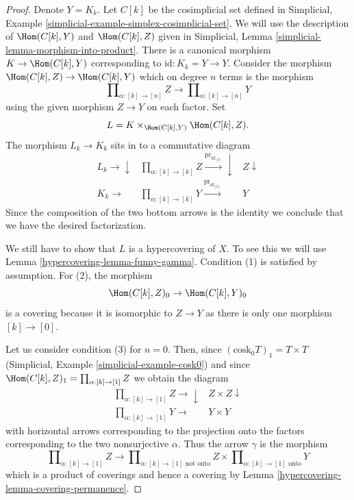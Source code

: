 \begin{proof}

Denote $Y = K_k$. Let $C[k]$ be the cosimplicial set defined in
Simplicial, Example \ref{simplicial-example-simplex-cosimplicial-set}.
We will use the description of $\Hom(C[k], Y)$ and $\Hom(C[k], Z)$
given in
Simplicial, Lemma \ref{simplicial-lemma-morphism-into-product}.
There is a canonical morphism
$K \to \Hom(C[k], Y)$ corresponding to $\text{id} : K_k = Y \to Y$.
Consider the morphism $\Hom(C[k], Z) \to \Hom(C[k], Y)$
which on degree $n$ terms is the morphism
$$
\prod\nolimits_{\alpha : [k] \to [n]} Z
\longrightarrow
\prod\nolimits_{\alpha : [k] \to [n]} Y
$$
using the given morphism $Z \to Y$ on each factor. Set
$$
L = K \times_{\Hom(C[k], Y)} \Hom(C[k], Z).
$$
The morphism $L_k \to K_k$ sits in to a commutative diagram
$$
\begin{array}{ccc}L_k \longrightarrow\downarrow & \prod_{\alpha : [k] \to [k]} Z \overset{\text{pr}_{\text{id}_{[k]}}}{\longrightarrow}\downarrow & Z \downarrow \\ K_k \longrightarrow & \prod_{\alpha : [k] \to [k]} Y \overset{\text{pr}_{\text{id}_{[k]}}}{\longrightarrow} & Y\end{array}
$$
Since the composition of the two bottom arrows is the identity
we conclude that we have the desired factorization.

\medskip\noindent
We still have to show that $L$ is a hypercovering of $X$.
To see this we will use Lemma \ref{hypercovering-lemma-funny-gamma}.
Condition (1) is satisfied by assumption.
For (2), the morphism
$$
\Hom(C[k], Z)_0 \to \Hom(C[k], Y)_0
$$
is a covering because it is isomorphic to $Z \to Y$ as
there is only one morphism $[k] \to [0]$.

\medskip\noindent
Let us consider condition (3) for $n = 0$. Then, since
$(\text{cosk}_0 T)_1 = T \times T$
(Simplicial, Example \ref{simplicial-example-cosk0})
and since $\Hom(C[k], Z)_1 = \prod_{\alpha : [k] \to [1]} Z$
we obtain the diagram
$$
\begin{array}{cc}\prod\nolimits_{\alpha : [k] \to [1]} Z \longrightarrow\downarrow & Z \times Z \downarrow \\ \prod\nolimits_{\alpha : [k] \to [1]} Y \longrightarrow & Y \times Y\end{array}
$$
with horizontal arrows corresponding to the projection onto the factors
corresponding to the two nonsurjective $\alpha$. Thus the arrow $\gamma$
is the morphism
$$
\prod\nolimits_{\alpha : [k] \to [1]} Z
\longrightarrow
\prod\nolimits_{\alpha : [k] \to [1]\text{ not onto}} Z
\times
\prod\nolimits_{\alpha : [k] \to [1]\text{ onto}} Y
$$
which is a product of coverings and hence a covering by
Lemma \ref{hypercovering-lemma-covering-permanence}.


\end{proof}
